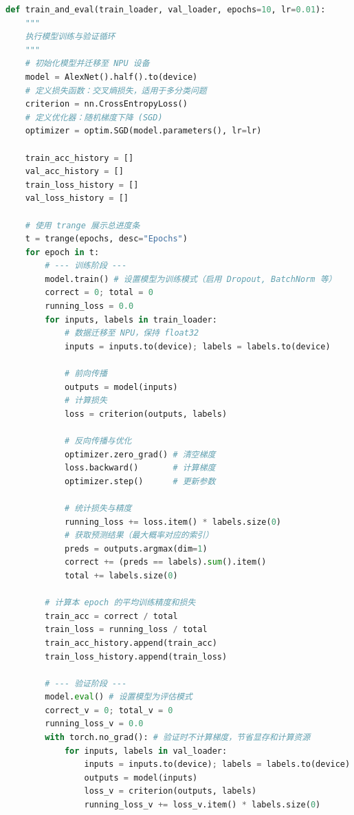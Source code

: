 \begin{lstlisting}[language=Python]
def train_and_eval(train_loader, val_loader, epochs=10, lr=0.01):
    """
    执行模型训练与验证循环
    """
    # 初始化模型并迁移至 NPU 设备
    model = AlexNet().half().to(device)
    # 定义损失函数：交叉熵损失，适用于多分类问题
    criterion = nn.CrossEntropyLoss()
    # 定义优化器：随机梯度下降 (SGD)
    optimizer = optim.SGD(model.parameters(), lr=lr)

    train_acc_history = []
    val_acc_history = []
    train_loss_history = []
    val_loss_history = []

    # 使用 trange 展示总进度条
    t = trange(epochs, desc="Epochs")
    for epoch in t:
        # --- 训练阶段 ---
        model.train() # 设置模型为训练模式（启用 Dropout, BatchNorm 等）
        correct = 0; total = 0
        running_loss = 0.0
        for inputs, labels in train_loader:
            # 数据迁移至 NPU，保持 float32
            inputs = inputs.to(device); labels = labels.to(device)
            
            # 前向传播
            outputs = model(inputs)
            # 计算损失
            loss = criterion(outputs, labels)
            
            # 反向传播与优化
            optimizer.zero_grad() # 清空梯度
            loss.backward()       # 计算梯度
            optimizer.step()      # 更新参数
            
            # 统计损失与精度
            running_loss += loss.item() * labels.size(0)
            # 获取预测结果（最大概率对应的索引）
            preds = outputs.argmax(dim=1)
            correct += (preds == labels).sum().item()
            total += labels.size(0)
        
        # 计算本 epoch 的平均训练精度和损失
        train_acc = correct / total
        train_loss = running_loss / total
        train_acc_history.append(train_acc)
        train_loss_history.append(train_loss)

        # --- 验证阶段 ---
        model.eval() # 设置模型为评估模式
        correct_v = 0; total_v = 0
        running_loss_v = 0.0
        with torch.no_grad(): # 验证时不计算梯度，节省显存和计算资源
            for inputs, labels in val_loader:
                inputs = inputs.to(device); labels = labels.to(device)
                outputs = model(inputs)
                loss_v = criterion(outputs, labels)
                running_loss_v += loss_v.item() * labels.size(0)
\end{lstlisting}

